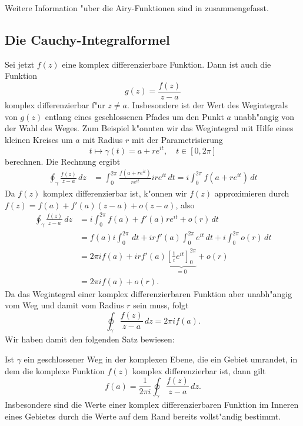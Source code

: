 Weitere Information "uber die Airy-Funktionen sind in \cite{skript:airy}
zusammengefasst.

\subsection{Die Cauchy-Integralformel}
%
Sei jetzt $f(z)$ eine komplex differenzierbare Funktion.
Dann ist auch die Funktion
\[
g(z)=\frac{f(z)}{z-a}
\]
komplex differenzierbar f"ur $z\ne a$.
Insbesondere ist der Wert des Wegintegrals von $g(z)$ entlang
eines geschlossenen Pfades um den Punkt $a$ unabh"angig von der Wahl
des Weges.
Zum Beispiel k"onnten wir das Wegintegral mit Hilfe eines kleinen Kreises
um $a$ mit Radius $r$ mit der Parametrisierung
\[
t\mapsto \gamma(t)=a+re^{it},\quad t\in[0,2\pi]
\]
berechnen.
Die Rechnung ergibt
\begin{align*}
\oint_\gamma \frac{f(z)}{z-a}\,dz
&=
\int_0^{2\pi} \frac{f(a+re^{it})}{re^{it}}ire^{it}\,dt
=
i\int_0^{2\pi} f(a+re^{it})\,dt
\end{align*}
Da $f(z)$ komplex differenzierbar ist, k"onnen wir $f(z)$ approximieren
durch $f(z)=f(a)+f'(a)(z-a)+o(z-a)$, also
\begin{align*}
\oint_{\gamma} \frac{f(z)}{z-a}\,dz
&=
i\int_0^{2\pi}f(a) + f'(a)re^{it}+o(r)\,dt
\\
&=
f(a)i\int_0^{2\pi}\,dt
+ irf'(a)\int_0^{2\pi} e^{it}\,dt + i\int_0^{2\pi}o(r)\,dt
\\
&=
2\pi i f(a) + irf'(a)\underbrace{\left[\frac1{i}e^{it}\right]_0^{2\pi}}_{\displaystyle=0}+o(r)
\\
&=2\pi i f(a)+o(r).
\end{align*}
Da das Wegintegral einer komplex differenzierbaren Funktion aber unabh"angig
vom Weg und damit vom Radius $r$ sein muss, folgt
\[
\oint_\gamma \frac{f(z)}{z-a}\,dz=2\pi i f(a).
\]
Wir haben damit den folgenden Satz bewiesen:

\begin{satz}[Cauchy]
Ist $\gamma$ ein geschlossener Weg in der komplexen Ebene, die ein
Gebiet umrandet, in dem die komplexe Funktion $f(z)$ komplex
differenzierbar ist, dann gilt
\[
f(a)=\frac{1}{2\pi i}\oint_{\gamma}\frac{f(z)}{z-a}\,dz.
\]
Insbesondere sind die Werte einer komplex differenzierbaren Funktion 
im Inneren eines Gebietes durch die Werte auf dem Rand bereits vollst"andig
bestimmt.
\end{satz}

